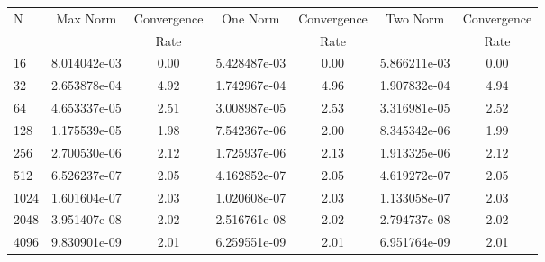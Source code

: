 \documentclass[12pt]{article}
\begin{document}
	\begin{tabular}{l|c|c|c|c|c|c}
		N&Max Norm&Convergence&One Norm&Convergence&Two Norm&Convergence\\
		&&Rate&&Rate&&Rate\\
		\hline
		16&8.014042e-03&0.00&5.428487e-03&0.00&5.866211e-03&0.00\\
		\hline
		32&2.653878e-04&4.92&1.742967e-04&4.96&1.907832e-04&4.94\\
		\hline
		64&4.653337e-05&2.51&3.008987e-05&2.53&3.316981e-05&2.52\\
		\hline
		128&1.175539e-05&1.98&7.542367e-06&2.00&8.345342e-06&1.99\\
		\hline
		256&2.700530e-06&2.12&1.725937e-06&2.13&1.913325e-06&2.12\\
		\hline
		512&6.526237e-07&2.05&4.162852e-07&2.05&4.619272e-07&2.05\\
		\hline
		1024&1.601604e-07&2.03&1.020608e-07&2.03&1.133058e-07&2.03\\
		\hline
		2048&3.951407e-08&2.02&2.516761e-08&2.02&2.794737e-08&2.02\\
		\hline
		4096&9.830901e-09&2.01&6.259551e-09&2.01&6.951764e-09&2.01\\
	\end{tabular}
\end{document}
